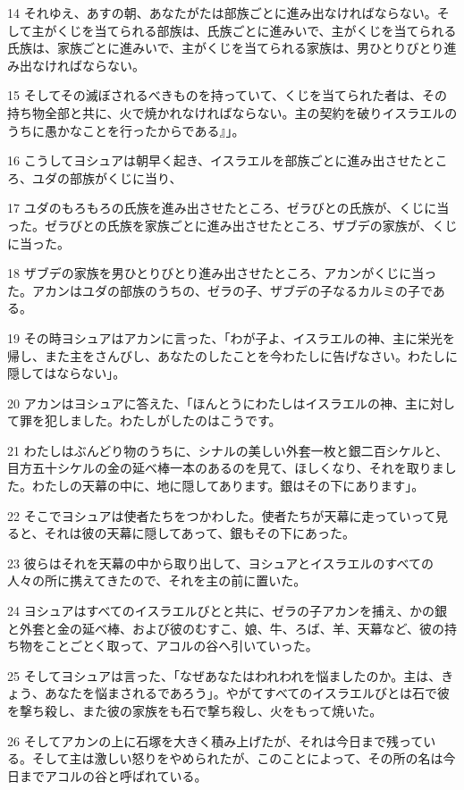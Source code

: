 \par 14 それゆえ、あすの朝、あなたがたは部族ごとに進み出なければならない。そして主がくじを当てられる部族は、氏族ごとに進みいで、主がくじを当てられる氏族は、家族ごとに進みいで、主がくじを当てられる家族は、男ひとりびとり進み出なければならない。
\par 15 そしてその滅ぼされるべきものを持っていて、くじを当てられた者は、その持ち物全部と共に、火で焼かれなければならない。主の契約を破りイスラエルのうちに愚かなことを行ったからである』」。
\par 16 こうしてヨシュアは朝早く起き、イスラエルを部族ごとに進み出させたところ、ユダの部族がくじに当り、
\par 17 ユダのもろもろの氏族を進み出させたところ、ゼラびとの氏族が、くじに当った。ゼラびとの氏族を家族ごとに進み出させたところ、ザブデの家族が、くじに当った。
\par 18 ザブデの家族を男ひとりびとり進み出させたところ、アカンがくじに当った。アカンはユダの部族のうちの、ゼラの子、ザブデの子なるカルミの子である。
\par 19 その時ヨシュアはアカンに言った、「わが子よ、イスラエルの神、主に栄光を帰し、また主をさんびし、あなたのしたことを今わたしに告げなさい。わたしに隠してはならない」。
\par 20 アカンはヨシュアに答えた、「ほんとうにわたしはイスラエルの神、主に対して罪を犯しました。わたしがしたのはこうです。
\par 21 わたしはぶんどり物のうちに、シナルの美しい外套一枚と銀二百シケルと、目方五十シケルの金の延べ棒一本のあるのを見て、ほしくなり、それを取りました。わたしの天幕の中に、地に隠してあります。銀はその下にあります」。
\par 22 そこでヨシュアは使者たちをつかわした。使者たちが天幕に走っていって見ると、それは彼の天幕に隠してあって、銀もその下にあった。
\par 23 彼らはそれを天幕の中から取り出して、ヨシュアとイスラエルのすべての人々の所に携えてきたので、それを主の前に置いた。
\par 24 ヨシュアはすべてのイスラエルびとと共に、ゼラの子アカンを捕え、かの銀と外套と金の延べ棒、および彼のむすこ、娘、牛、ろば、羊、天幕など、彼の持ち物をことごとく取って、アコルの谷へ引いていった。
\par 25 そしてヨシュアは言った、「なぜあなたはわれわれを悩ましたのか。主は、きょう、あなたを悩まされるであろう」。やがてすべてのイスラエルびとは石で彼を撃ち殺し、また彼の家族をも石で撃ち殺し、火をもって焼いた。
\par 26 そしてアカンの上に石塚を大きく積み上げたが、それは今日まで残っている。そして主は激しい怒りをやめられたが、このことによって、その所の名は今日までアコルの谷と呼ばれている。

